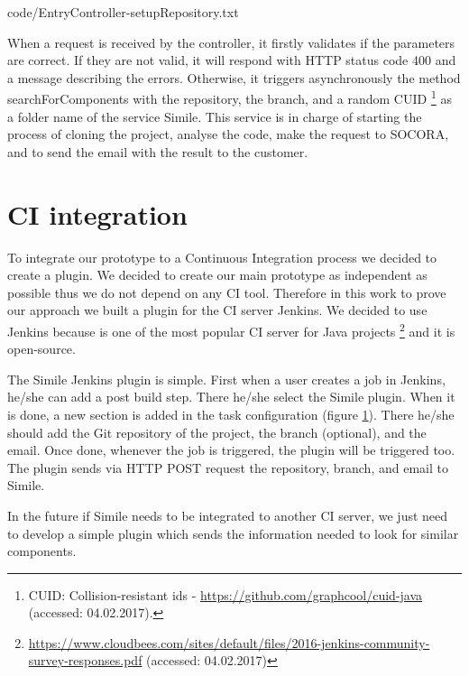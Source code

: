 
{code/EntryController-setupRepository.txt}

When a request is received by the controller, it firstly validates if the parameters are correct. If they are not valid, it will respond with HTTP status code 400 and a message describing the errors. Otherwise, it triggers asynchronously the method searchForComponents with the repository, the branch, and a random CUID \footnote{CUID: Collision-resistant ids - \url{https://github.com/graphcool/cuid-java} (accessed: 04.02.2017).} as a folder name of the service Simile. This service is in charge of starting the process of cloning the project, analyse the code, make the request to SOCORA, and to send the email with the result to the customer.

\section{CI integration}
To integrate our prototype to a Continuous Integration process we decided to create a plugin. We decided to create our main prototype as independent as possible thus we do not depend on any CI tool. Therefore in this work to prove our approach we built a plugin for the CI server Jenkins. We decided to use Jenkins because is one of the most popular CI server for Java projects \footnote{\url{https://www.cloudbees.com/sites/default/files/2016-jenkins-community-survey-responses.pdf} (accessed: 04.02.2017)} and it is open-source.

The Simile Jenkins plugin is simple. First when a user creates a job in Jenkins, he/she can add a post build step. There he/she select the Simile plugin. When it is done, a new section is added in the task configuration (figure \ref{}). There he/she should add the Git repository of the project, the branch (optional), and the email. Once done, whenever the job is triggered, the plugin will be triggered too. The plugin sends via HTTP POST request the repository, branch, and email to Simile.


In the future if Simile needs to be integrated to another CI server, we just need to develop a simple plugin which sends the information needed to look for similar components. 